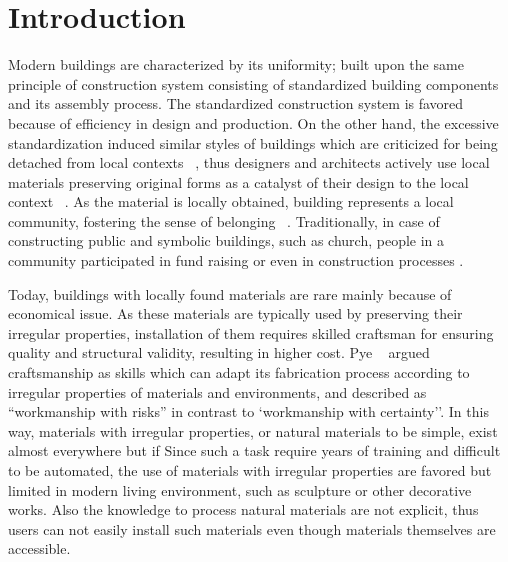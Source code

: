 \section{Introduction}
Modern buildings are characterized by its uniformity; built upon the same principle of construction system consisting of standardized building components and its assembly process.
The standardized construction system is favored because of efficiency in design and production.
On the other hand, the excessive standardization induced similar styles of buildings which are criticized for being detached from local contexts ~\cite{frampton1983towards}, thus designers and architects actively use local materials preserving original forms as a catalyst of their design to the local context ~\cite{oliver1997encyclopedia}.
As the material is locally obtained, building represents a local community, fostering the sense of belonging ~\cite{weston2003materials}.
Traditionally, in case of constructing public and symbolic buildings, such as church, people in a community participated in fund raising or even in construction processes \cite{weston2003materials}.

Today, buildings with locally found materials are rare mainly because of economical issue.
As these materials are typically used by preserving their irregular properties, installation of them requires skilled craftsman for ensuring quality and structural validity, resulting in higher cost.
Pye ~ argued craftsmanship as skills which can adapt its fabrication process according to irregular properties of materials and environments, and described as ``workmanship with risks'' in contrast to `workmanship with certainty''.
In this way, materials with irregular properties, or natural materials to be simple, exist almost everywhere but if
Since such a task require years of training and difficult to be automated, the use of materials with irregular properties are favored but limited in modern living environment, such as sculpture or other decorative works.
Also the knowledge to process natural materials are not explicit, thus users can not easily install such materials even though materials themselves are accessible.



